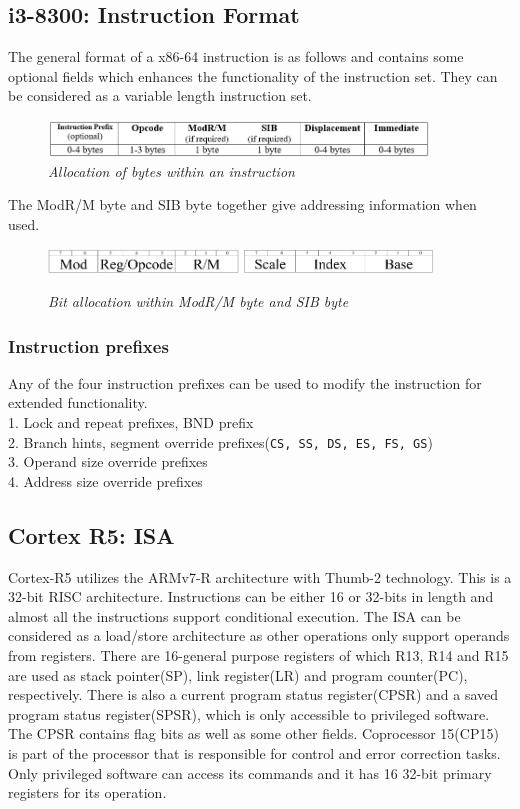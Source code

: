 \documentclass[a4paper,11pt]{article}
\begin{document}
\subsection{i3-8300: Instruction Format}
The general format of a x86-64 instruction is as follows and contains some optional fields which enhances the functionality of the instruction set. They can be considered as a variable length instruction set.
\begin{figure}[H]
\centering
\includegraphics[width=0.90\textwidth]{figures/InsForm.jpg}
\caption{{\small \textit{Allocation of bytes within an instruction}}\cite{i3dev}}
\end{figure}
The ModR/M byte and SIB byte together give addressing information when used.
\begin{figure}[H]
\centering
\includegraphics[width=0.45\textwidth]{figures/ModRM.jpg}
\includegraphics[width=0.45\textwidth]{figures/SIB.jpg}
\caption{{\small \textit{Bit allocation within ModR/M byte and SIB byte}}\cite{i3dev}}
\end{figure}
\subsubsection{Instruction prefixes\cite{x64asm}}
Any of the four instruction prefixes can be used to modify the instruction for extended functionality.\\
1.	Lock and repeat prefixes, BND prefix\\
2.	Branch hints, segment override prefixes({\tt CS, SS, DS, ES, FS, GS})\\
3.	Operand size override prefixes\\
4.	Address size override prefixes\\
\subsection{Cortex R5: ISA}
Cortex-R5 utilizes the ARMv7-R architecture with Thumb-2 technology. This is a 32-bit RISC architecture. Instructions can be either 16 or 32-bits in length and almost all the instructions support conditional execution. The ISA can be considered as a load/store architecture as other operations only support operands from registers. There are 16-general purpose registers of which R13, R14 and R15 are used as stack pointer(SP), link register(LR) and program counter(PC), respectively. There is also a current program status register(CPSR) and a saved program status register(SPSR), which is only accessible to privileged software. The CPSR contains flag bits as well as some other fields. Coprocessor 15(CP15) is part of the processor that is responsible for control and error correction tasks. Only privileged software can access its commands and it has 16 32-bit primary registers for its operation.
\end{document}
